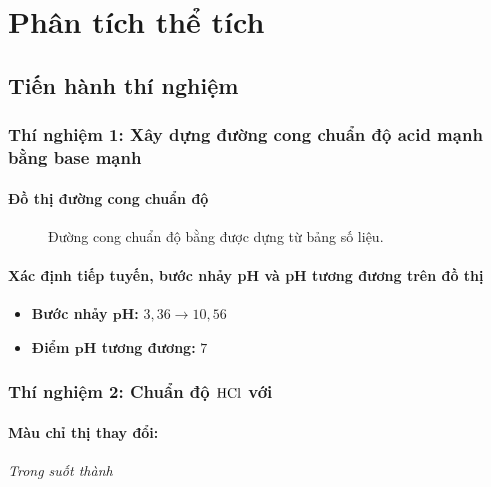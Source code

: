 \setcounter{chapter}{7}
\chapter{Phân tích thể tích}

\section{Tiến hành thí nghiệm}

\subsection{Thí nghiệm 1: Xây dựng đường cong chuẩn độ acid mạnh bằng base mạnh}

\subsubsection{Đồ thị đường cong chuẩn độ}
\begin{figure}[H]
    \centering
    
    \caption{Đường cong chuẩn độ  bằng  được dựng từ bảng số liệu.}
    \label{fig:duong-cong-chuan-do-hcl-naoh}
\end{figure}

\subsubsection{Xác định tiếp tuyến, bước nhảy pH và pH tương đương trên đồ thị}
    \begin{itemize}
        \item \textbf{Bước nhảy \(\mathbf{pH}\):}  \(3,36 \to 10,56\)
        \item \textbf{Điểm \(\mathbf{pH}\) tương đương:} \(7\)
    \end{itemize}

\subsection{Thí nghiệm 2: Chuẩn độ \(\ce{HCl}\) với \PhenolphthaleinWord}
    \subsubsection{Màu chỉ thị thay đổi:}
        \begin{center}
        \textit{Trong suốt thành \LightPinkWord}
        \end{center}
